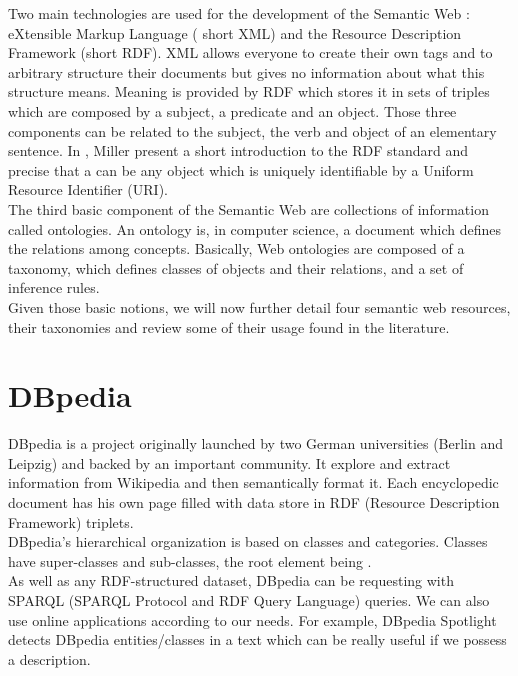 Two main technologies are used for the development of the Semantic Web : eXtensible Markup Language ( short XML) and the Resource Description Framework (short RDF). XML allows everyone to create their own tags and to arbitrary structure their documents but gives no information about what this structure means. Meaning is provided by RDF which stores it in sets of triples which are composed by a subject, a predicate and an object. Those three components can be related to the subject, the verb and object of an elementary sentence. In \cite{miller1998introduction}, Miller present a short introduction to the RDF standard and precise that a  can be any object which is uniquely identifiable by a Uniform Resource Identifier (URI).\\

The third basic component of the Semantic Web are collections of information called ontologies. An ontology is, in computer science, a document which defines the relations among concepts. Basically, Web ontologies are composed of a taxonomy, which defines classes of objects and their relations, and a set of inference rules.\\

Given those basic notions, we will now further detail four semantic web resources, their taxonomies and review some of their usage found in the literature.


\section{DBpedia}

DBpedia is a project originally launched by two German universities (Berlin and Leipzig) and backed by an important community. It explore and extract information from Wikipedia and then semantically format it. Each encyclopedic document has his own page filled with data store in RDF (Resource Description Framework) triplets.\\

DBpedia's hierarchical organization is based on classes and categories. Classes have super-classes and sub-classes, the root element being .\\

As well as any RDF-structured dataset, DBpedia can be requesting with SPARQL (SPARQL Protocol and RDF Query Language) queries. We can also use online applications according to our needs. For example, DBpedia Spotlight detects DBpedia entities/classes in a text which can be really useful if we possess a description.

